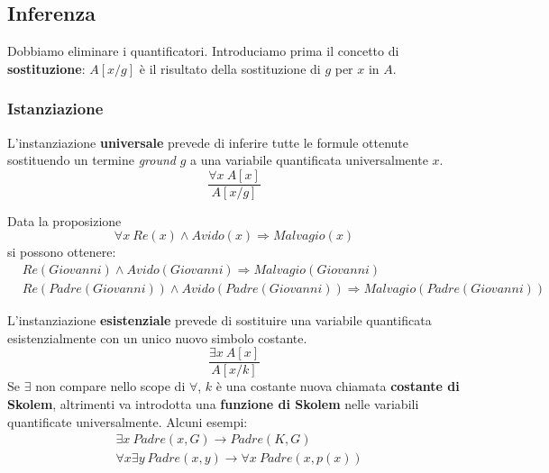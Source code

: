 \subsection{Inferenza}
Dobbiamo eliminare i quantificatori. Introduciamo prima il concetto di \textbf{sostituzione}: $A[x/g]$ è il risultato della sostituzione di $g$ per $x$ in $A$.
\subsubsection{Istanziazione}
L'instanziazione \textbf{universale} prevede di inferire tutte le formule ottenute sostituendo un termine \textit{ground} $g$ a una variabile quantificata universalmente $x$.
\begin{equation}
	\frac{\forall x \: A[x]}{A[x/g]}
\end{equation}
\begin{example}
	Data la proposizione
	\begin{equation*}
		\forall x \: Re(x) \land Avido(x) \Rightarrow Malvagio(x)
	\end{equation*}
	si possono ottenere:
	\begin{align*}
		&Re(Giovanni) \land Avido(Giovanni) \Rightarrow Malvagio(Giovanni)\\
		&Re(Padre(Giovanni))  \land Avido(Padre(Giovanni)) \Rightarrow Malvagio(Padre(Giovanni))
	\end{align*}
\end{example}
L'instanziazione \textbf{esistenziale} prevede di sostituire una variabile quantificata esistenzialmente con un unico nuovo simbolo costante.
\begin{equation}
	\frac{\exists x\: A[x]}{A[x/k]}
\end{equation}
Se $\exists$ non compare nello scope di $\forall$, $k$ è una costante nuova chiamata \textbf{costante di Skolem}, altrimenti va introdotta una \textbf{funzione di Skolem} nelle variabili quantificate universalmente. Alcuni esempi:
\begin{align*}
	&\exists x \: Padre(x, G) \longrightarrow Padre(K, G) \\
	&\forall x \exists y \: Padre(x,y) \longrightarrow \forall x \: Padre(x, p(x))
\end{align*}

